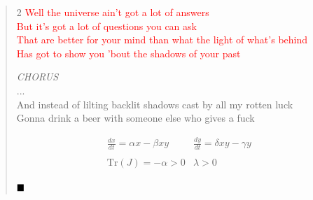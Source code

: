 \documentclass[11pt]{book}
\begin{document}
\begin{verse}
\begin{multicols}{2}
\textcolor{Red}{
\hspace{2em} Well the universe ain't got a lot of answers \\
\hspace{2em} But it's got a lot of questions you can ask \\
\hspace{2em} That are better for your mind than what the light of what's behind \\
\hspace{2em} Has got to show you 'bout the shadows of your past
}

\hspace{2em} \emph{CHORUS}\\
\hspace{2em} ... \\
\hspace{2em} And instead of lilting backlit shadows cast by all my rotten luck \\
\hspace{2em} Gonna drink a beer with someone else who gives a fuck

\begin{equation} \label{eq:lk-instablity}
\begin{array}{cc}
\frac{dx}{dt} = \alpha x - \beta xy & \frac{dy}{dt} = \delta xy - \gamma y \\
\\
\text{Tr}(J) = -\alpha > 0 & \lambda > 0
\end{array}
\end{equation}

$\hfill\blacksquare$

\end{multicols}
\end{verse}

\newpage
\end{document}
